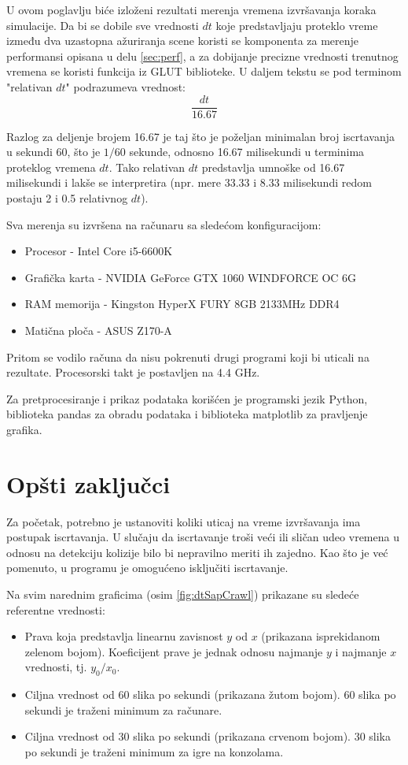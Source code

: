 \documentclass[12pt,oneside]{memoir}
\begin{document}
U ovom poglavlju biće izloženi rezultati merenja vremena izvršavanja koraka simulacije.
Da bi se dobile sve vrednosti $dt$ koje predstavljaju proteklo vreme između dva uzastopna ažuriranja scene
koristi se komponenta za merenje performansi opisana u delu \ref{sec:perf}, a za dobijanje precizne vrednosti trenutnog vremena se koristi funkcija iz GLUT biblioteke.
U daljem tekstu se pod terminom "relativan $dt$" podrazumeva vrednost:
$$ \frac{ dt }{16.67} $$

Razlog za deljenje brojem 16.67 je taj što je poželjan minimalan broj iscrtavanja u sekundi 60, 
što je $1/60$ sekunde, odnosno 16.67 milisekundi u terminima proteklog vremena $dt$.
Tako relativan $dt$ predstavlja umnoške od 16.67 milisekundi i lakše se interpretira
(npr. mere 33.33 i 8.33 milisekundi redom postaju 2 i 0.5 relativnog $dt$).

Sva merenja su izvršena na računaru sa sledećom konfiguracijom:
\begin{itemize}  
	\item Procesor - Intel Core i5-6600K 
	\item Grafička karta - NVIDIA GeForce GTX 1060 WINDFORCE OC 6G
	\item RAM memorija - Kingston HyperX FURY 8GB 2133MHz DDR4 
	\item Matična ploča - ASUS Z170-A
\end{itemize}  
Pritom se vodilo računa da nisu pokrenuti drugi programi koji bi uticali na rezultate.
Procesorski takt je postavljen na 4.4 GHz.

Za pretprocesiranje i prikaz podataka korišćen je programski jezik Python,
biblioteka pandas \cite{pandas} za obradu podataka i biblioteka matplotlib \cite{plt} za pravljenje grafika.

\section{Opšti zaključci}

Za početak, potrebno je ustanoviti  koliki uticaj na vreme izvršavanja ima postupak iscrtavanja.
U slučaju da iscrtavanje troši veći ili sličan udeo vremena  u odnosu na detekciju kolizije bilo bi nepravilno meriti ih zajedno.
Kao što je već pomenuto, u programu je omogućeno isključiti iscrtavanje.

Na svim narednim graficima (osim \ref{fig:dtSapCrawl}) prikazane su sledeće referentne vrednosti:
\begin{itemize}  
	\item Prava koja predstavlja linearnu zavisnost $y$ od $x$ (prikazana isprekidanom zelenom bojom).
	Koeficijent prave je jednak odnosu najmanje $y$ i najmanje $x$ vrednosti, tj. $y_0/x_0$.
	\item Ciljna vrednost od 60 slika po sekundi (prikazana žutom bojom).
	60 slika po sekundi je traženi minimum za računare.
	\item Ciljna vrednost od 30 slika po sekundi (prikazana crvenom bojom).
	30 slika po sekundi je traženi minimum za igre na konzolama.
\end{itemize}  
\end{document}
